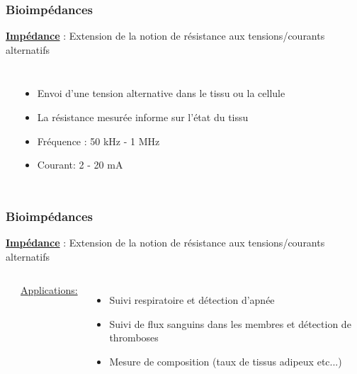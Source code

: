 \documentclass{beamer}
\begin{document}
\begin{frame}
\frametitle{Bioimpédances}
\textbf{\underline{Impédance}} : Extension de la notion de résistance aux tensions/courants alternatifs 
\begin{columns}
\column{60mm}
\begin{center}
\end{center}
\column{60mm}
\begin{itemize}
\item Envoi d'une tension alternative dans le tissu ou la cellule
\vspace{0.2cm}
\item La résistance mesurée informe sur l'état du tissu
\vspace{0.2cm}
\item Fréquence : 50 kHz - 1 MHz 
\vspace{0.2cm}
\item Courant: 2 - 20 mA 
\end{itemize}
\end{columns} 
\end{frame}

\begin{frame}
\frametitle{Bioimpédances}
\textbf{\underline{Impédance}} : Extension de la notion de résistance aux tensions/courants alternatifs 
\begin{columns}
\column{60mm}
\begin{center}
\end{center}
\column{60mm}
\underline{Applications:} 
\begin{itemize}
\item  Suivi respiratoire et détection d'apnée
\vspace{0.4cm}
\item Suivi de flux sanguins dans les membres et détection de thromboses
\vspace{0.4cm}
\item Mesure de composition (taux de tissus adipeux etc...)
\end{itemize}
\end{columns} 
\end{frame}
\end{document}
